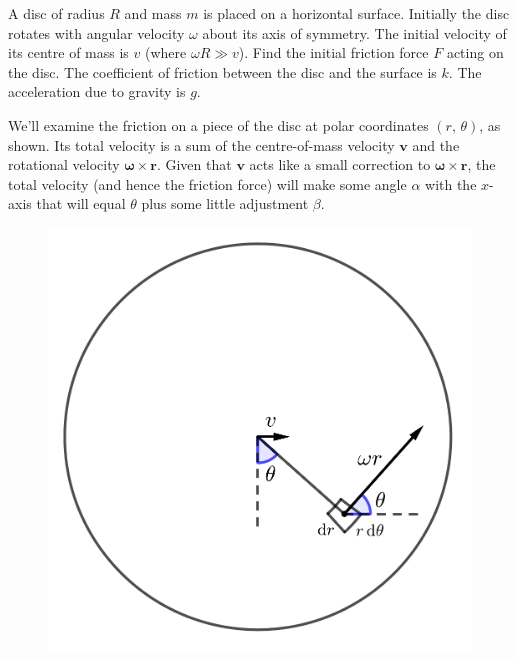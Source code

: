 \documentclass[../TST.tex]{subfiles}
\begin{document}
\begin{pproblem}
A disc of radius $R$ and mass $m$ is placed on a horizontal surface. Initially the disc rotates with angular velocity $\omega$ about its axis of symmetry. The initial velocity of its centre of mass is $v$ (where $\omega R\gg v$). Find the initial friction force $F$ acting on the disc. The coefficient of friction between the disc and the surface is $k$. The acceleration due to gravity is $g$.
\end{pproblem}

\ifprob \else
	\begin{solution} We'll examine the friction on a piece of the disc at polar coordinates $(r,\,\theta)$, as shown. Its total velocity is a sum of the centre-of-mass velocity $\mathbf{v}$ and the rotational velocity $\boldsymbol{\omega}\times\mathbf{r}$. Given that $\mathbf{v}$ acts like a small correction to $\boldsymbol{\omega}\times\mathbf{r}$, the total velocity (and hence the friction force) will make some angle $\alpha$ with the $x$-axis that will equal $\theta$ plus some little adjustment $\beta$.
\begin{figure}[h]
	\begin{minipage}[b]{0.4\textwidth}
    \centering
\includegraphics[width=\textwidth]{fig/a2016_s21.pdf}
	\end{minipage}\hfill
	\begin{minipage}[b]{0.5\textwidth}

\end{minipage}
\end{figure}
\end{solution}
\end{document}
